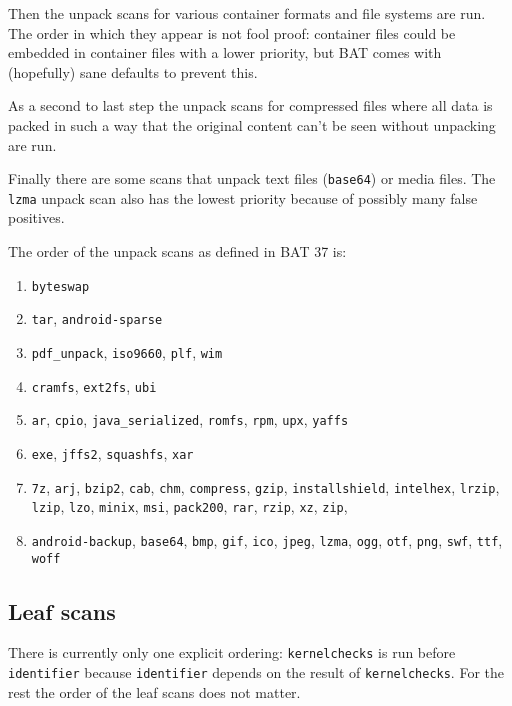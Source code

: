 \documentclass[10pt,a4paper]{article}
\begin{document}
Then the unpack scans for various container formats and file systems are run.
The order in which they appear is not fool proof: container files could be
embedded in container files with a lower priority, but BAT comes with
(hopefully) sane defaults to prevent this.

As a second to last step the unpack scans for compressed files where all data is
packed in such a way that the original content can't be seen without unpacking
are run.

Finally there are some scans that unpack text files (\texttt{base64}) or media
files. The \texttt{lzma} unpack scan also has the lowest priority because of
possibly many false positives.

The order of the unpack scans as defined in BAT 37 is:

\begin{enumerate}
\item \texttt{byteswap}
\item \texttt{tar}, \texttt{android-sparse}
\item \texttt{pdf\_unpack}, \texttt{iso9660}, \texttt{plf}, \texttt{wim}
\item \texttt{cramfs}, \texttt{ext2fs}, \texttt{ubi}
\item \texttt{ar}, \texttt{cpio}, \texttt{java\_serialized}, \texttt{romfs},
\texttt{rpm}, \texttt{upx}, \texttt{yaffs}
\item \texttt{exe}, \texttt{jffs2}, \texttt{squashfs}, \texttt{xar}
\item \texttt{7z}, \texttt{arj}, \texttt{bzip2}, \texttt{cab}, \texttt{chm},
\texttt{compress}, \texttt{gzip}, \texttt{installshield}, \texttt{intelhex},
\texttt{lrzip}, \texttt{lzip}, \texttt{lzo}, \texttt{minix}, \texttt{msi},
\texttt{pack200}, \texttt{rar}, \texttt{rzip}, \texttt{xz}, \texttt{zip},
\item \texttt{android-backup}, \texttt{base64}, \texttt{bmp}, \texttt{gif},
\texttt{ico}, \texttt{jpeg}, \texttt{lzma}, \texttt{ogg}, \texttt{otf},
\texttt{png}, \texttt{swf}, \texttt{ttf}, \texttt{woff}
\end{enumerate}

\subsection{Leaf scans}

There is currently only one explicit ordering: \texttt{kernelchecks} is run
before \texttt{identifier} because \texttt{identifier} depends on the result
of \texttt{kernelchecks}. For the rest the order of the leaf scans does not
matter.
\end{document}
